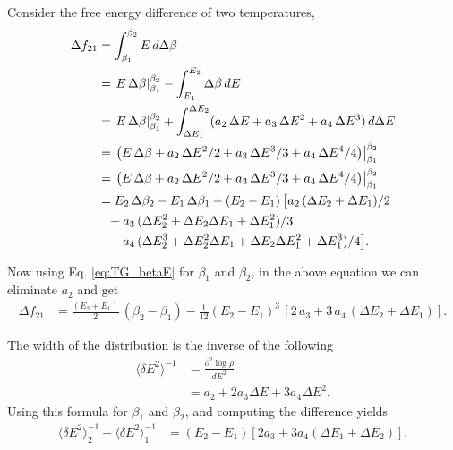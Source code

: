\documentclass[aip,jcp,preprint,notitlepage, superscriptaddress]{revtex4-1}
\begin{document}
Consider the free energy difference of two temperatures,
%
\begin{align}
\Delta f_{21}
&=
\int_{ \beta_1 }^{ \beta_2 } E \, d \Delta \beta
\notag \\
&=
\left.
  E \, \Delta \beta
\right|_{\beta_1}^{\beta_2}
-
\int_{E_1}^{E_2}
  \Delta \beta \, dE
\notag \\
&=
\left.
  E \, \Delta \beta
\right|_{\beta_1}^{\beta_2}
+
\int_{\Delta E_1}^{\Delta E_2}
  (a_2 \, \Delta E + a_3 \, \Delta E^2 + a_4 \, \Delta E^3) \, d\Delta E
\notag \\
&=
\left.
\left(
  E \, \Delta \beta
  +
  a_2 \, \Delta E^2/2 + a_3 \, \Delta E^3/3 + a_4 \, \Delta E^4/4
\right)
\right|_{\beta_1}^{\beta_2}
\notag \\
&=
\left.
\left(
  E \, \Delta \beta
  + a_2 \, \Delta E^2/2 + a_3 \, \Delta E^3/3 + a_4 \, \Delta E^4/4
\right)
\right|_{\beta_1}^{\beta_2}
\notag \\
&=
E_2 \, \Delta \beta_2 - E_1 \, \Delta \beta_1
+
(E_2 - E_1) \,
\big[
  a_2 \, ( \Delta E_2 + \Delta E_1) / 2
\notag\\
&\phantom{=}
  + a_3 \, ( \Delta E_2^2 + \Delta E_2 \Delta E_1 + \Delta E_1^2 )/3
\notag \\
&\phantom{=}
  + a_4 \, ( \Delta E_2^3 + \Delta E_2^2 \Delta E_1 + \Delta E_2 \Delta E_1^2 + \Delta E_1^3 ) / 4
\big].
\label{eq:TG_dfstep1}
\end{align}



Now using Eq. \eqref{eq:TG_betaE} for $\beta_1$ and $\beta_2$,
in the above equation we can eliminate $a_2$ and get
%
\begin{align*}
\Delta f_{21}
&=
\frac { (E_2 + E_1) }{ 2 } \, (\beta_2 - \beta_1)
-
\frac{ 1 } { 12 }
(E_2 - E_1)^3 \,
\left[
  2 \, a_3
  +3 \, a_4 \, ( \Delta E_2 + \Delta E_1 )
\right].
\end{align*}



The width of the distribution is the inverse
of the following
%
\begin{align*}
\langle \delta E^2 \rangle^{-1}
&=
\frac{ \partial^2 \log \rho } { d E^2 }
\\
&=
a_2 + 2 a_3 \Delta E + 3 a_4 \Delta E^2.
\end{align*}
%
Using this formula for $\beta_1$ and $\beta_2$,
and computing the difference yields
%
\begin{align*}
\langle \delta E^2 \rangle_2^{-1}
-
\langle \delta E^2 \rangle_1^{-1}
&=
(E_2 - E_1) [ 2 a_3  + 3 a_4 (\Delta E_1 + \Delta E_2) ].
\end{align*}
\end{document}
